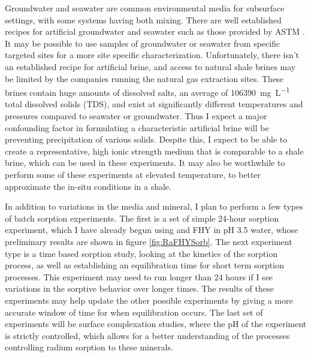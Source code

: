 \documentclass[twoside,12pt,titlepage]{article}
\newcommand{\isotope}[2]{\ch{^{#1}#2}}
\begin{document}
Groundwater and seawater are common environmental media for subsurface settings, with some systems having both mixing. There are well established recipes for artificial groundwater and seawater such as those provided by ASTM \cite{ASTMSeawater2013}. It may be possible to use samples of groundwater or seawater from specific targeted sites for a more site specific characterization. Unfortunately, there isn't an established recipe for artificial brine, and access to natural shale brines may be limited by the companies running the natural gas extraction sites. These brines contain huge amounts of dissolved salts, an average of \SI{106390}{\milli\gram\per\liter} total dissolved solids (TDS), and exist at significantly different temperatures and pressures compared to seawater or groundwater. Thus I expect a major confounding factor in formulating a characteristic artificial brine will be preventing precipitation of various solids. Despite this, I expect to be able to create a representative, high ionic strength medium that is comparable to a shale brine, which can be used in these experiments. It may also be worthwhile to perform some of these experiments at elevated temperature, to better approximate the in-situ conditions in a shale.

\par In addition to variations in the media and mineral, I plan to perform a few types of batch sorption experiments. The first is a set of simple 24-hour sorption experiment, which I have already begun using \isotope{226}{Ra} and FHY in pH \num{3.5} water, whose preliminary results are shown in figure \ref{fig:RaFHYSorb}. The next experiment type is a time based sorption study, looking at the kinetics of the sorption process, as well as establishing an equilibration time for short term sorption processes. This experiment may need to run longer than 24 hours if I see variations in the sorptive behavior over longer times. The results of these experiments may help update the other possible experiments by giving a more accurate window of time for when equilibration occurs. The last set of experiments will be surface complexation studies, where the pH of the experiment is strictly controlled, which allows for a better understanding of the processes controlling radium sorption to these minerals.
\end{document}
